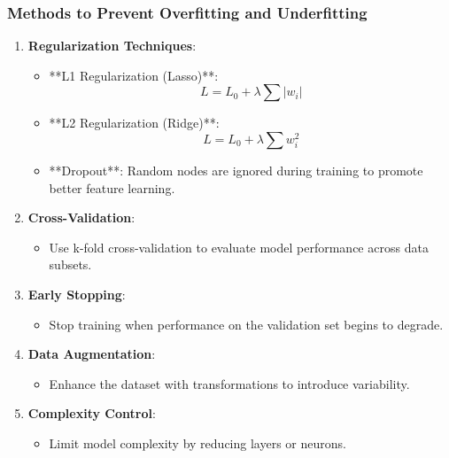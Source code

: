 \documentclass[aspectratio=169]{beamer}
\begin{document}
\begin{frame}[fragile]
  \frametitle{Methods to Prevent Overfitting and Underfitting}
  \begin{enumerate}
    \item \textbf{Regularization Techniques}:
      \begin{itemize}
        \item **L1 Regularization (Lasso)**: 
          \begin{equation}
          L = L_0 + \lambda \sum |w_i|
          \end{equation}
        \item **L2 Regularization (Ridge)**: 
          \begin{equation}
          L = L_0 + \lambda \sum w_i^2
          \end{equation}
        \item **Dropout**: Random nodes are ignored during training to promote better feature learning.
      \end{itemize}

    \item \textbf{Cross-Validation}: 
      \begin{itemize}
        \item Use k-fold cross-validation to evaluate model performance across data subsets.
      \end{itemize}

    \item \textbf{Early Stopping}:
      \begin{itemize}
        \item Stop training when performance on the validation set begins to degrade.
      \end{itemize}

    \item \textbf{Data Augmentation}:
      \begin{itemize}
        \item Enhance the dataset with transformations to introduce variability.
      \end{itemize}

    \item \textbf{Complexity Control}:
      \begin{itemize}
        \item Limit model complexity by reducing layers or neurons.
      \end{itemize}
  \end{enumerate}
\end{frame}
\end{document}
